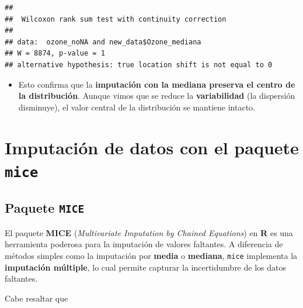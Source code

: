 \documentclass[
]{book}
\newenvironment{Shaded}{\begin{snugshade}}{\end{snugshade}}
\newcommand{\CommentTok}[1]{\textcolor[rgb]{0.56,0.35,0.01}{\textit{#1}}}
\newcommand{\FunctionTok}[1]{\textcolor[rgb]{0.13,0.29,0.53}{\textbf{#1}}}
\newcommand{\NormalTok}[1]{#1}
\newcommand{\SpecialCharTok}[1]{\textcolor[rgb]{0.81,0.36,0.00}{\textbf{#1}}}
\providecommand{\tightlist}{%
  \setlength{\itemsep}{0pt}\setlength{\parskip}{0pt}}
\begin{document}
\begin{Shaded}
\end{Shaded}

\begin{verbatim}
## 
##  Wilcoxon rank sum test with continuity correction
## 
## data:  ozone_noNA and new_data$Ozone_mediana
## W = 8874, p-value = 1
## alternative hypothesis: true location shift is not equal to 0
\end{verbatim}

\begin{itemize}
\tightlist
\item
  Esto confirma que la \textbf{imputación con la mediana preserva el centro de la distribución}. Aunque vimos que se reduce la \textbf{variabilidad} (la dispersión disminuye), el valor central de la distribución se mantiene intacto.
\end{itemize}

\section{\texorpdfstring{Imputación de datos con el paquete \texttt{mice}}{Imputación de datos con el paquete mice}}\label{imputaciuxf3n-de-datos-con-el-paquete-mice}

\subsection{\texorpdfstring{Paquete \texttt{MICE}}{Paquete MICE}}\label{paquete-mice}

El paquete \textbf{MICE} (\emph{Multivariate Imputation by Chained Equations}) en \textbf{R} es una herramienta poderosa para la imputación de valores faltantes. A diferencia de métodos simples como la imputación por \textbf{media} o \textbf{mediana}, \texttt{mice} implementa la \textbf{imputación múltiple}, lo cual permite capturar la incertidumbre de los datos faltantes.

Cabe resaltar que
\end{document}
